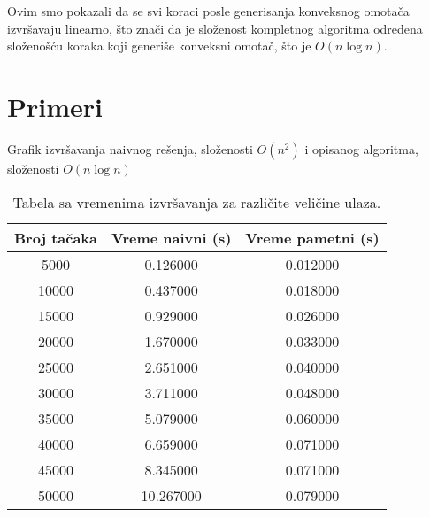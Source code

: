 \documentclass[a4paper]{article}
\begin{document}
Ovim smo pokazali da se svi koraci posle generisanja konveksnog omotača izvršavaju linearno, što znači
da je složenost kompletnog algoritma određena složenošću koraka koji generiše konveksni omotač, što je
\(O(n\log{n})\).


\section{Primeri}
Grafik izvršavanja naivnog rešenja, složenosti \(O(n^{2})\) i opisanog algoritma, složenosti \(O(n\log{n})\)

\begin{figure}
    
\end{figure}


\begin{table}[h]
\centering
    \begin{tabular}{c c c}
        Broj tačaka & Vreme naivni (s) & Vreme pametni (s) \\ \toprule
        5000 & 0.126000 & 0.012000 \\ \midrule
        10000 & 0.437000 & 0.018000 \\ \midrule
        15000 & 0.929000 & 0.026000 \\ \midrule
        20000 & 1.670000 & 0.033000 \\ \midrule
        25000 & 2.651000 & 0.040000 \\ \midrule
        30000 & 3.711000 & 0.048000 \\ \midrule
        35000 & 5.079000 & 0.060000 \\ \midrule
        40000 & 6.659000 & 0.071000 \\ \midrule
        45000 & 8.345000 & 0.071000 \\ \midrule
        50000 & 10.267000 & 0.079000 \\ \bottomrule
    \end{tabular}
    \caption{Tabela sa vremenima izvršavanja za različite veličine ulaza.}
\end{table}
\end{document}
